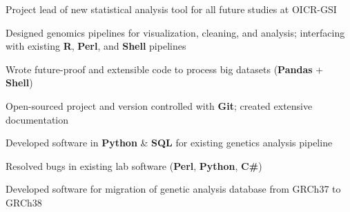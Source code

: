 \documentclass[]{chandan-cv}
\begin{document}
\begin{minipage}[t]{0.77\textwidth}

\begin{tightemize}
	\item Project lead of new statistical analysis tool for all future studies at OICR-GSI
	\item Designed genomics pipelines for visualization, cleaning, and analysis;
	interfacing with existing \textbf{R}, \textbf{Perl}, and \textbf{Shell} pipelines
	\item Wrote future-proof and extensible code to process big datasets (\textbf{Pandas} + \textbf{Shell})
	\item Open-sourced project and version controlled with \textbf{Git}; created extensive documentation
\end{tightemize}
\sectionsep

\begin{tightemize}
	\item Developed software in \textbf{Python} \& \textbf{SQL} for existing genetics analysis pipeline
	\item Resolved bugs in existing lab software (\textbf{Perl}, \textbf{Python}, \textbf{C\#})
	\item Developed software for migration of genetic analysis database from GRCh37 to GRCh38
\end{tightemize}
\sectionsep



\end{minipage}
\end{document}

